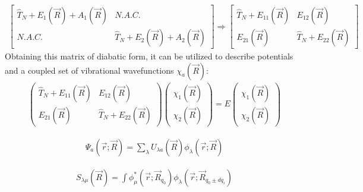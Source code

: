\begin{equation}\label{eq:atodmatrix}
    \begin{split}
        \begin{bmatrix}
            \hat{T}_N + E_{1}(\Vec{R}) + A_{1}(\Vec{R}) & N.A.C.\\
            N.A.C.& \hat{T}_N + E_{2}{(\Vec{R}) + A_{2}(\Vec{R})}
        \end{bmatrix}
        \Rightarrow
        \begin{bmatrix}
            \hat{T}_{N} + E_{11}(\Vec{R}) & E_{12}(\Vec{R}) \\ 
            E_{21}(\Vec{R}) & \hat{T}_{N} + E_{22}{(\Vec{R})}
        \end{bmatrix}
    \end{split}
\end{equation}
%
Obtaining this matrix of diabatic form, it can be utilized to describe potentials and a coupled set of vibrational wavefunctions $\chi_a(\Vec{R})$:
\begin{equation} 
    \begin{split}
        \begin{pmatrix}
            \hat{T}_{N} + E_{11}(\Vec{R}) & E_{12}(\Vec{R}) \\ 
            E_{21}(\Vec{R}) & \hat{T}_{N} + E_{22}{(\Vec{R})}
        \end{pmatrix}
        \begin{pmatrix}
            \chi_{1}(\Vec{R}) \\ 
            \chi_{2}(\Vec{R})
        \end{pmatrix} 
        = E
        \begin{pmatrix}
            \chi_{1}(\Vec{R}) \\ 
            \chi_{2}(\Vec{R})
        \end{pmatrix} 
    \end{split}
\end{equation}

\begin{equation}\label{eq:diabaticstates}
    \begin{split}
            \Psi_{a}(\Vec{r};\Vec{R}) = \sum_{\lambda} U_{\lambda a} (\Vec{R}) \phi_{\lambda} (\Vec{r};\Vec{R})
    \end{split}
\end{equation}

\begin{equation}\label{eq:overlapmatrix}
    \begin{split}
            S_{\lambda \mu}(\Vec{R}) = \int \phi_{\mu}^{*} (\Vec{r};\Vec{R}_{q_0}) \phi_{\lambda} (\Vec{r};\Vec{R}_{q_0 \pm dq_{i}})
    \end{split}
\end{equation}

